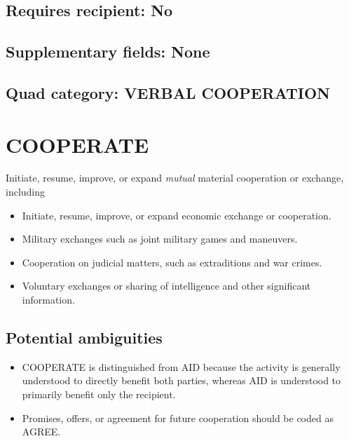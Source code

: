 \documentclass[11pt]{report}
\newcommand{\plcat}[1]{\textsf{#1}}
\newcommand{\ti}[1]{\textit{#1}}
\begin{document}
\subsection{Requires recipient: No}

\subsection{Supplementary fields: None}

\subsection{Quad category: VERBAL COOPERATION}


\newpage

\section{COOPERATE}

Initiate, resume, improve, or expand \ti{mutual} material cooperation or exchange, including

\begin{itemize}
\item Initiate, resume, improve, or expand economic exchange or cooperation.

\item Military exchanges such as joint military games and maneuvers.

\item Cooperation on judicial matters, such as extraditions and war crimes.

\item Voluntary exchanges or sharing of intelligence and other significant information.

\end{itemize}

\subsection{Potential ambiguities}

\begin{itemize}
\item \plcat{COOPERATE} is distinguished from \plcat{AID} because the activity is generally understood to directly benefit both parties, whereas  \plcat{AID} is understood to primarily benefit only the recipient.
\item Promises, offers, or agreement for future cooperation should be coded as \plcat{AGREE}.
\end{itemize}
\end{document}
